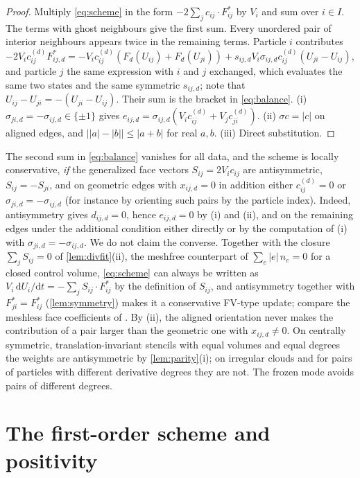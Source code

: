\documentclass[11pt,a4paper]{article}
\theoremstyle{plain}
\theoremstyle{definition}
\theoremstyle{remark}
\numberwithin{equation}{section}
\newcommand{\dd}{\mathrm{d}}
\newcommand{\Fs}{F^{*}}
\begin{document}
\begin{proof}
Multiply \eqref{eq:scheme} in the form $-2\sum_jc_{ij}\cdot\Fs_{ij}$ by $V_i$ and sum over $i\in I$. The terms with ghost neighbours give the first sum. Every unordered pair of interior neighbours appears twice in the remaining terms. Particle $i$ contributes $-2V_ic^{(d)}_{ij}\Fs_{ij,d}=-V_ic^{(d)}_{ij}(F_d(U_{ij})+F_d(U_{ji}))+s_{ij,d}V_i\sigma_{ij,d}c^{(d)}_{ij}(U_{ji}-U_{ij})$, and particle $j$ the same expression with $i$ and $j$ exchanged, which evaluates the same two states and the same symmetric $s_{ij,d}$; note that $U_{ij}-U_{ji}=-(U_{ji}-U_{ij})$. Their sum is the bracket in \eqref{eq:balance}. (i) $\sigma_{ji,d}=-\sigma_{ij,d}\in\{\pm1\}$ gives $e_{ij,d}=\sigma_{ij,d}(V_ic^{(d)}_{ij}+V_jc^{(d)}_{ji})$. (ii) $\sigma c=|c|$ on aligned edges, and $\big||a|-|b|\big|\le|a+b|$ for real $a,b$. (iii) Direct substitution.
\end{proof}

The second sum in \eqref{eq:balance} vanishes for all data, and the scheme is locally conservative, \emph{if} the generalized face vectors $S_{ij}=2V_ic_{ij}$ are antisymmetric, $S_{ij}=-S_{ji}$, and on geometric edges with $x_{ij,d}=0$ in addition either $c^{(d)}_{ij}=0$ or $\sigma_{ji,d}=-\sigma_{ij,d}$ (for instance by orienting such pairs by the particle index). Indeed, antisymmetry gives $d_{ij,d}=0$, hence $e_{ij,d}=0$ by (i) and (ii), and on the remaining edges under the additional condition either directly or by the computation of (i) with $\sigma_{ji,d}=-\sigma_{ij,d}$. We do not claim the converse. Together with the closure $\sum_jS_{ij}=0$ of \cref{lem:divfit}(ii), the meshfree counterpart of $\sum_e|e|\,n_e=0$ for a closed control volume, \eqref{eq:scheme} can always be written as $V_i\,\dd U_i/\dd t=-\sum_jS_{ij}\cdot\Fs_{ij}$ by the definition of $S_{ij}$, and antisymmetry together with $\Fs_{ji}=\Fs_{ij}$ (\cref{lem:symmetry}) makes it a conservative FV-type update; compare the meshless face coefficients of \cite{Chiu2011,Chiu2012}. By (ii), the aligned orientation never makes the contribution of a pair larger than the geometric one with $x_{ij,d}\ne0$. On centrally symmetric, translation-invariant stencils with equal volumes and equal degrees the weights are antisymmetric by \cref{lem:parity}(i); on irregular clouds and for pairs of particles with different derivative degrees they are not. The frozen mode avoids pairs of different degrees.

\section{The first-order scheme and positivity}\label{sec:positivity}
\end{document}
